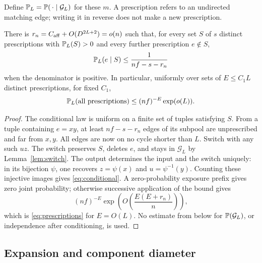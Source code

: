 Define $\mathbb P_L=\mathbb P(\,\cdot\mid\mathcal G_L)$ for these $m$. A prescription refers to an undirected matching edge; writing it in reverse does not make a new prescription.
\begin{lemma}\label{lem:prescriptions}
There is $r_n=C_{\rm aff}+O(D^{2L+2})=o(n)$ such that, for every set $S$ of $s$ distinct prescriptions with $\mathbb P_L(S)>0$ and every further prescription $e\notin S$,
\begin{equation}\label{eq:conditional}
 \mathbb P_L(e\mid S)\le\frac1{nf-s-r_n}
\end{equation}
when the denominator is positive. In particular, uniformly over sets of $E\le C_1L$ distinct prescriptions, for fixed $C_1$,
\begin{equation}\label{eq:prescriptions}
 \mathbb P_L(\text{all prescriptions})\le(nf)^{-E}\exp(o(L)).
\end{equation}
\end{lemma}
\begin{proof}
The conditional law is uniform on a finite set of tuples satisfying $S$. From a tuple containing $e=xy$, at least $nf-s-r_n$ edges of its subpool are unprescribed and far from $x,y$. All edges are now on no cycle shorter than $L$. Switch with any such $uz$. The switch preserves $S$, deletes $e$, and stays in $\mathcal G_L$ by Lemma~\ref{lem:switch}. The output determines the input and the switch uniquely: in its bijection $\psi$, one recovers $z=\psi(x)$ and $u=\psi^{-1}(y)$. Counting these injective images gives \eqref{eq:conditional}. A zero-probability exposure prefix gives zero joint probability; otherwise successive application of the bound gives
\[
 (nf)^{-E}\exp\left(O\!\left(\frac{E(E+r_n)}n\right)\right),
\]
which is \eqref{eq:prescriptions} for $E=O(L)$. No estimate from below for $\mathbb P(\mathcal G_L)$, or independence after conditioning, is used.
\end{proof}

\subsection{Expansion and component diameter}

